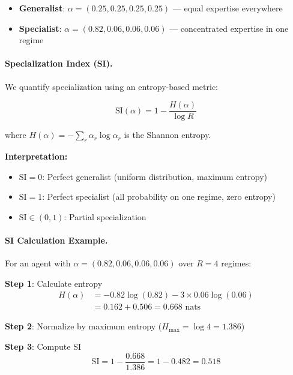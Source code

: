 \begin{itemize}
    \item \textbf{Generalist}: $\alpha = (0.25, 0.25, 0.25, 0.25)$ --- equal expertise everywhere
    \item \textbf{Specialist}: $\alpha = (0.82, 0.06, 0.06, 0.06)$ --- concentrated expertise in one regime
\end{itemize}

\paragraph{Specialization Index (SI).} We quantify specialization using an entropy-based metric:

\begin{equation}
\boxed{\text{SI}(\alpha) = 1 - \frac{H(\alpha)}{\log R}}
\end{equation}

where $H(\alpha) = -\sum_r \alpha_r \log \alpha_r$ is the Shannon entropy.

\textbf{Interpretation:}
\begin{itemize}
    \item $\text{SI} = 0$: Perfect generalist (uniform distribution, maximum entropy)
    \item $\text{SI} = 1$: Perfect specialist (all probability on one regime, zero entropy)
    \item $\text{SI} \in (0, 1)$: Partial specialization
\end{itemize}

\paragraph{SI Calculation Example.}

For an agent with $\alpha = (0.82, 0.06, 0.06, 0.06)$ over $R = 4$ regimes:

\textbf{Step 1}: Calculate entropy
\begin{align}
H(\alpha) &= -0.82 \log(0.82) - 3 \times 0.06 \log(0.06) \\
&= 0.162 + 0.506 = 0.668 \text{ nats}
\end{align}

\textbf{Step 2}: Normalize by maximum entropy ($H_{\max} = \log 4 = 1.386$)

\textbf{Step 3}: Compute SI
\begin{equation}
\text{SI} = 1 - \frac{0.668}{1.386} = 1 - 0.482 = \boxed{0.518}
\end{equation}

